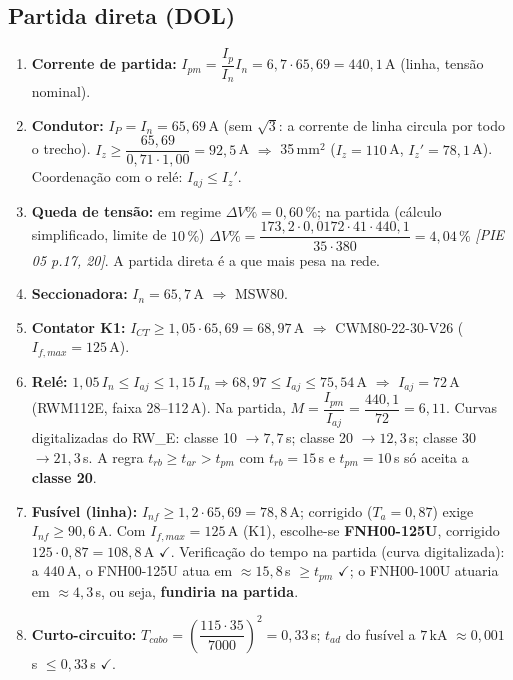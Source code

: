\documentclass[11pt,a4paper]{article}
\newcommand{\src}[1]{\textit{[#1]}}
\begin{document}
\subsection{Partida direta (DOL)}
\begin{enumerate}[leftmargin=1.4em]
\item \textbf{Corrente de partida:} $I_{pm}=\dfrac{I_p}{I_n}I_n = 6{,}7\cdot 65{,}69 = 440{,}1$\,A (linha, tens\~ao nominal).
\item \textbf{Condutor:} $I_P=I_n=65{,}69$\,A (sem $\sqrt{3}$: a corrente de linha circula por todo o trecho). $I_z\ge \dfrac{65{,}69}{0{,}71\cdot 1{,}00}=92{,}5$\,A $\Rightarrow$ 35\,mm$^2$ ($I_z=110$\,A, $I_z'=78{,}1$\,A). Coordena\c{c}\~ao com o rel\'e: $I_{aj}\le I_z'$.
\item \textbf{Queda de tens\~ao:} em regime $\Delta V\%=0{,}60\,\%$; na partida (c\'alculo simplificado, limite de $10\,\%$) $\Delta V\%=\dfrac{173{,}2\cdot 0{,}0172\cdot 41\cdot 440{,}1}{35\cdot 380}=4{,}04\,\%$ \src{PIE 05 p.17, 20}. A partida direta \'e a que mais pesa na rede.
\item \textbf{Seccionadora:} $I_n=65{,}7$\,A $\Rightarrow$ MSW80.
\item \textbf{Contator K1:} $I_{CT}\ge 1{,}05\cdot 65{,}69 = 68{,}97$\,A $\Rightarrow$ CWM80-22-30-V26 ($I_{f,max}=125$\,A).
\item \textbf{Rel\'e:} $1{,}05\,I_n\le I_{aj}\le 1{,}15\,I_n \Rightarrow 68{,}97\le I_{aj}\le 75{,}54$\,A $\Rightarrow$ $I_{aj}=72$\,A (RWM112E, faixa 28--112\,A). Na partida, $M=\dfrac{I_{pm}}{I_{aj}}=\dfrac{440{,}1}{72}=6{,}11$. Curvas digitalizadas do RW\_E: classe 10 $\to 7{,}7$\,s; classe 20 $\to 12{,}3$\,s; classe 30 $\to 21{,}3$\,s. A regra $t_{rb}\ge t_{ar}>t_{pm}$ com $t_{rb}=15$\,s e $t_{pm}=10$\,s s\'o aceita a \textbf{classe 20}.
\item \textbf{Fus\'ivel (linha):} $I_{nf}\ge 1{,}2\cdot 65{,}69 = 78{,}8$\,A; corrigido ($T_a=0{,}87$) exige $I_{nf}\ge 90{,}6$\,A. Com $I_{f,max}=125$\,A (K1), escolhe-se \textbf{FNH00-125U}, corrigido $125\cdot 0{,}87=108{,}8$\,A $\checkmark$. Verifica\c{c}\~ao do tempo na partida (curva digitalizada): a $440$\,A, o FNH00-125U atua em $\approx 15{,}8$\,s $\ge t_{pm}$ $\checkmark$; o FNH00-100U atuaria em $\approx 4{,}3$\,s, ou seja, \textbf{fundiria na partida}.
\item \textbf{Curto-circuito:} $T_{cabo}=\left(\dfrac{115\cdot 35}{7000}\right)^2=0{,}33$\,s; $t_{ad}$ do fus\'ivel a $7$\,kA $\approx 0{,}001$\,s $\le 0{,}33$\,s $\checkmark$.
\end{enumerate}
\end{document}
